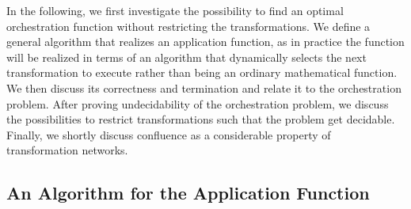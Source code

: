 In the following, we first investigate the possibility to find an optimal orchestration function without restricting the transformations.
We define a general algorithm that realizes an application function, as in practice the function will be realized in terms of an algorithm that dynamically selects the next transformation to execute rather than being an ordinary mathematical function.
We then discuss its correctness and termination and relate it to the orchestration problem.
After proving undecidability of the orchestration problem, we discuss the possibilities to restrict transformations such that the problem get decidable.
Finally, we shortly discuss confluence as a considerable property of transformation networks.



\subsection{An Algorithm for the Application Function}
\label{chap:orchestration:decidability:algorithm}


